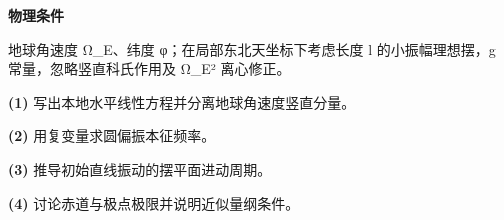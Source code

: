 \textbf{物理条件}\par 地球角速度 Ω\_E、纬度 φ；在局部东北天坐标下考虑长度 l 的小振幅理想摆，g 常量，忽略竖直科氏作用及 Ω\_E² 离心修正。
\par\noindent\textbf{(1)} 写出本地水平线性方程并分离地球角速度竖直分量。
\par\noindent\textbf{(2)} 用复变量求圆偏振本征频率。
\par\noindent\textbf{(3)} 推导初始直线振动的摆平面进动周期。
\par\noindent\textbf{(4)} 讨论赤道与极点极限并说明近似量纲条件。

